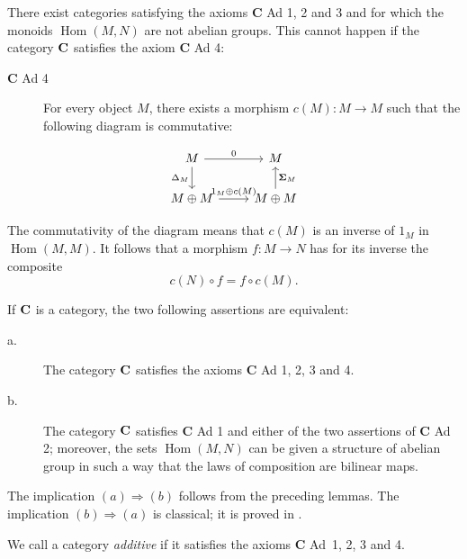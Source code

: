 There exist categories satisfying the axioms $\mathbf{C}$ Ad 1, 2 and 3 and
for which the monoids $\operatorname{Hom}(M,N)$ are not abelian groups. This
cannot happen if the category $\mathbf{C}$ satisfies the axiom $\mathbf{C}$ Ad 4:

\begin{description}
\item[$\mathbf{C}$ Ad 4] For every object $M$, there exists a morphism
$c(M)\colon M\to M$ such that the following diagram is commutative:
\end{description}

\[
\begin{tikzcd}
M \arrow[r, "0"] \arrow[d, "\Delta_M"'] & M \\
M \oplus M \arrow[r, "1_M \oplus c(M)"] & M \oplus M \arrow[u, "\boldsymbol{\Sigma}_M"']
\end{tikzcd}
\]

The commutativity of the diagram means that $c(M)$ is an inverse of $1_M$ in
$\operatorname{Hom}(M,M)$.
It follows that a morphism $f\colon M\to N$ has for its inverse the composite
\[
  c(N)\circ f = f\circ c(M).
\]

\begin{proposition}
If $\mathbf{C}$ is a category, the two following assertions are equivalent:

\begin{description}
\item[\normalfont a.] The category $\mathbf{C}$ satisfies the axioms $\mathbf{C}$
Ad 1, 2, 3 and 4.

\item[\normalfont b.] The category $\mathbf{C}$ satisfies $\mathbf{C}$ Ad 1 and
either of the two assertions of $\mathbf{C}$ Ad 2; moreover, the sets
$\operatorname{Hom}(M,N)$ can be given a structure of abelian group in such a
way that the laws of composition are bilinear maps.
\end{description}
\end{proposition}

The implication $(a)\Rightarrow(b)$ follows from the preceding lemmas. The
implication $(b)\Rightarrow(a)$ is classical; it is proved in \cite{grothendieck-1}.

We call a category \emph{additive} if it satisfies the axioms $\mathbf{C}$
Ad~1, 2, 3 and 4.

